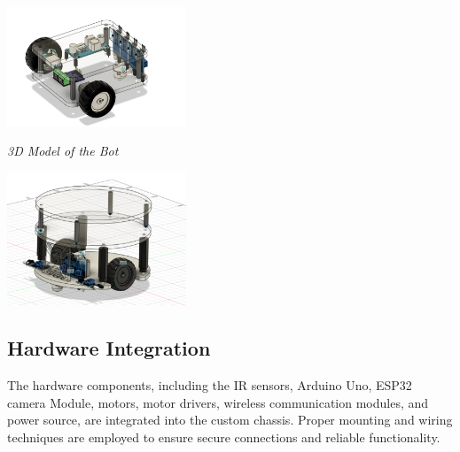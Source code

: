 \documentclass[a4paper,12pt,oneside]{book}
\begin{document}
\includegraphics[width=0.4\textwidth]{intial bot cad.png}
\caption{\textit{3D Model of the Bot}}
\includegraphics[width=0.4\textwidth]{bot cad.png}

\subsection{Hardware Integration}
The hardware components, including the IR sensors, Arduino Uno, ESP32 camera Module, motors, motor drivers, wireless communication modules, and power source, are integrated into the custom chassis. Proper mounting and wiring techniques are employed to ensure secure connections and reliable functionality.
\end{document}
